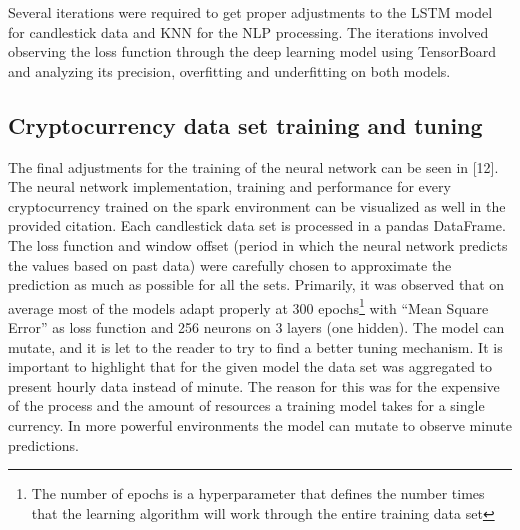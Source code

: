 Several iterations were required to get proper adjustments to the LSTM model for candlestick data and KNN for the NLP processing. The iterations involved observing the loss function through the deep learning model using TensorBoard and analyzing its precision, overfitting and underfitting on both models.

\subsection{Cryptocurrency data set training and tuning }

The final adjustments for the training of the neural network can be seen in [12]. The neural network implementation, training and performance for every cryptocurrency trained on the spark environment can be visualized as well in the provided citation. Each candlestick data set is processed in a pandas DataFrame. The loss function and window offset (period in which the neural network predicts the values based on past data) were carefully chosen to approximate the prediction as much as possible for all the sets. Primarily, it was observed that on average most of the models adapt properly at 300 epochs\footnote{The number of epochs is a hyperparameter that defines the number times that the learning algorithm will work through the entire training data set\cite{brownlee_when_2018}}  with “Mean Square Error” as loss function and 256 neurons on 3 layers (one hidden). The model can mutate, and it is let to the reader to try to find a better tuning mechanism. It is important to highlight that for the given model the data set was aggregated to present hourly data instead of minute. The reason for this was for the expensive of the process and the amount of resources a training model takes for a single currency. In more powerful environments the model can mutate to observe minute predictions.

